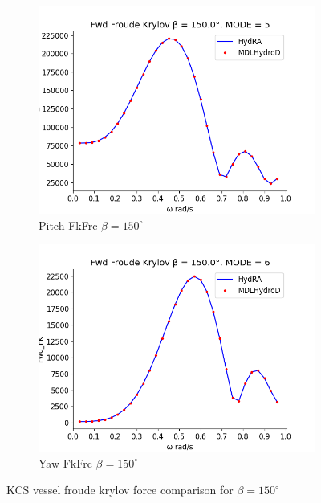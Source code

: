\begin{figure}[H]
\begin{subfigure}[b]{0.49\textwidth}
        \includegraphics[width=\textwidth]{plots/kcs/fk/fk5.png}
        \caption{Pitch FkFrc $\beta = 150^{\circ}$}
    \end{subfigure}
    \begin{subfigure}[b]{0.49\textwidth}
        \includegraphics[width=\textwidth]{plots/kcs/fk/fk6.png}
        \caption{Yaw FkFrc $\beta = 150^{\circ}$}
    \end{subfigure}
    \caption{KCS vessel froude krylov force comparison for $\beta= 150^{\circ}$}
    \label{fig:kcs_froude_krylov}
\end{figure}

